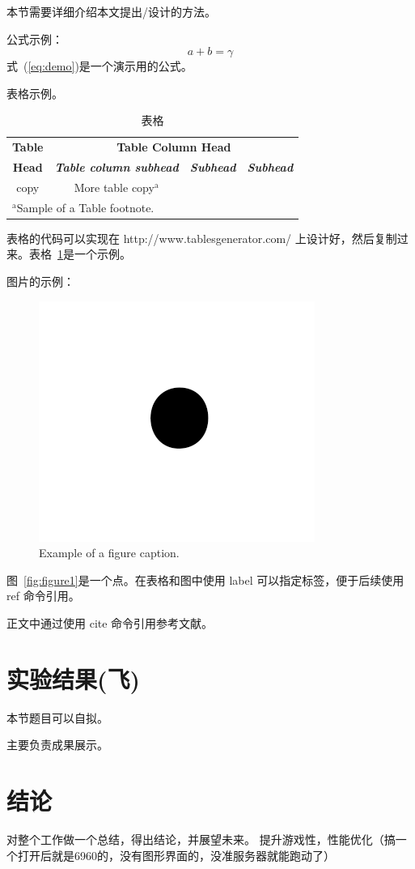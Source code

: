 \documentclass[conference]{IEEEtran}
\begin{document}
本节需要详细介绍本文提出/设计的方法。

公式示例：
\begin{equation}
a+b=\gamma\label{eq:demo}
\end{equation}
式~(\ref{eq:demo})是一个演示用的公式。

表格示例。
\begin{table}[htbp]
\caption{表格}
\begin{center}
\begin{tabular}{|c|c|c|c|}
\hline
\textbf{Table}&\multicolumn{3}{|c|}{\textbf{Table Column Head}} \\
\cline{2-4} 
\textbf{Head} & \textbf{\textit{Table column subhead}}& \textbf{\textit{Subhead}}& \textbf{\textit{Subhead}} \\
\hline
copy& More table copy$^{\mathrm{a}}$& &  \\
\hline
\multicolumn{4}{l}{$^{\mathrm{a}}$Sample of a Table footnote.}
\end{tabular}
\label{tbl:test}
\end{center}
\end{table}
表格的代码可以实现在 http://www.tablesgenerator.com/ 上设计好，然后复制过来。表格~\ref{tbl:test}是一个示例。

图片的示例：
\begin{figure}[htbp]
\centerline{\includegraphics{images/fig1.png}}
\caption{Example of a figure caption.}
\label{fig:figure-1}
\end{figure}
图~\ref{fig:figure1}是一个点。在表格和图中使用 label 可以指定标签，便于后续使用 ref 命令引用。


正文中通过使用 cite 命令引用参考文献。


\section{实验结果(飞)}
本节题目可以自拟。

主要负责成果展示。


\section{结论}
对整个工作做一个总结，得出结论，并展望未来。
提升游戏性，性能优化（搞一个打开后就是6960的，没有图形界面的，没准服务器就能跑动了）





\end{document}
